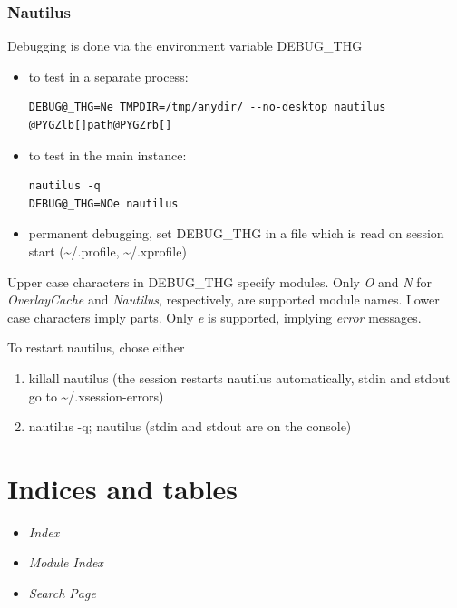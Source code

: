 \documentclass[letterpaper,10pt,english]{manual}
\begin{document}
\subsection{Nautilus}

Debugging is done via the environment variable DEBUG\_THG
\begin{itemize}
\item {} 
to test in a separate process:

\begin{Verbatim}[commandchars=@\[\]]
DEBUG@_THG=Ne TMPDIR=/tmp/anydir/ --no-desktop nautilus @PYGZlb[]path@PYGZrb[]
\end{Verbatim}

\item {} 
to test in the main instance:

\begin{Verbatim}[commandchars=@\[\]]
nautilus -q
DEBUG@_THG=NOe nautilus
\end{Verbatim}

\item {} 
permanent debugging, set DEBUG\_THG in a file which is read on session
start (\textasciitilde{}/.profile, \textasciitilde{}/.xprofile)

\end{itemize}

Upper case characters in DEBUG\_THG specify modules.  Only \emph{O} and \emph{N}
for \emph{OverlayCache} and \emph{Nautilus}, respectively, are supported module
names.  Lower case characters imply parts. Only \emph{e} is supported,
implying \emph{error} messages.

To restart nautilus, chose either
\begin{enumerate}
\item {} 
killall nautilus (the session restarts nautilus automatically, stdin and stdout go to \textasciitilde{}/.xsession-errors)

\item {} 
nautilus -q; nautilus (stdin and stdout are on the console)

\end{enumerate}


\chapter{Indices and tables}
\begin{itemize}
\item {} 
\emph{Index}

\item {} 
\emph{Module Index}

\item {} 
\emph{Search Page}

\end{itemize}


\renewcommand{\indexname}{Module Index}
\printmodindex
\renewcommand{\indexname}{Index}
\printindex
\end{document}
